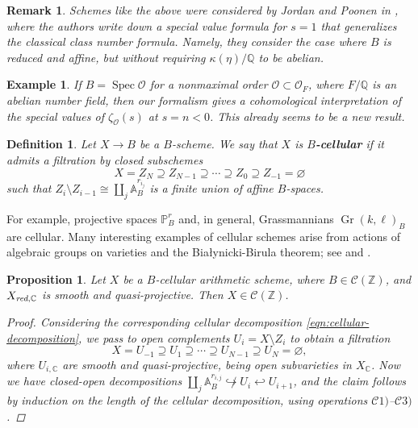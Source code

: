 \documentclass[10pt,a4paper,oneside,draft]{article}
\DeclareMathOperator{\Spec}{Spec}
\newcommand{\CC}{\mathbb{C}}
\newcommand{\QQ}{\mathbb{Q}}
\newcommand{\ZZ}{\mathbb{Z}}
\renewcommand{\AA}{\mathbb{A}}
\newcommand{\PP}{\mathbb{P}}
\DeclareMathOperator{\Gr}{Gr}
\renewcommand{\emptyset}{\varnothing}
\newcommand{\red}{\text{\it red}}
\theoremstyle{myplain}
\newtheorem{proposition}[theorem]{Proposition}
\theoremstyle{mydefinition}
\newtheorem{definition}[theorem]{Definition}
\newtheorem{remark}[theorem]{Remark}
\newtheorem{example}[theorem]{Example}
\numberwithin{equation}{section}
\begin{document}
\begin{remark}
  Schemes like the above were considered by Jordan and Poonen in
  \cite{Jordan-Poonen-2020}, where the authors write down a special value
  formula for $s = 1$ that generalizes the classical class number
  formula. Namely, they consider the case where $B$ is reduced and affine,
  but without requiring $\kappa (\eta)/\QQ$ to be abelian.
\end{remark}

\begin{example}
  If $B = \Spec \mathcal{O}$ for a nonmaximal order
  $\mathcal{O} \subset \mathcal{O}_F$, where $F/\QQ$ is an abelian number field,
  then our formalism gives a cohomological interpretation of the special values
  of $\zeta_\mathcal{O} (s)$ at $s = n < 0$. This already seems to be a new
  result.
\end{example}

\begin{definition}
  \label{dfn:B-cellular-scheme}
  Let $X \to B$ be a $B$-scheme. We say that $X$ is \textbf{$B$-cellular} if it
  admits a filtration by closed subschemes
  \begin{equation}
    \label{eqn:cellular-decomposition}
    X = Z_N \supseteq Z_{N-1} \supseteq \cdots \supseteq Z_0 \supseteq Z_{-1} = \emptyset
  \end{equation}
  such that $Z_i\setminus Z_{i-1} \cong \coprod_j \AA^{r_{i_j}}_B$ is a finite
  union of affine $B$-spaces.
\end{definition}

For example, projective spaces $\PP^r_B$ and, in general, Grassmannians
$\Gr (k,\ell)_B$ are cellular. Many interesting examples of cellular schemes
arise from actions of algebraic groups on varieties and the Bia\l{}ynicki-Birula
theorem; see \cite{Wendt-2010} and \cite{Brosnan-2005}.

\begin{proposition}
  \label{prop:cellular-schemes-in-C(Z)}
  Let $X$ be a $B$-cellular arithmetic scheme, where $B \in \mathcal{C} (\ZZ)$,
  and $X_{\red,\CC}$ is smooth and quasi-projective. Then
  $X \in \mathcal{C} (\ZZ)$.

  \begin{proof}
    Considering the corresponding cellular decomposition
    \eqref{eqn:cellular-decomposition}, we pass to open complements
    $U_i = X\setminus Z_i$ to obtain a filtration
    $$X = U_{-1} \supseteq U_1 \supseteq \cdots \supseteq U_{N-1} \supseteq U_N = \emptyset,$$
    where $U_{i,\CC}$ are smooth and quasi-projective, being \emph{open}
    subvarieties in $X_\CC$. Now we have closed-open decompositions
    $\coprod_j \AA^{r_{i,j}}_B \not\hookrightarrow U_i \hookleftarrow U_{i+1}$,
    and the claim follows by induction on the length of the cellular
    decomposition, using operations $\mathcal{C}1)$--$\mathcal{C}3)$.
  \end{proof}
\end{proposition}
\end{document}
